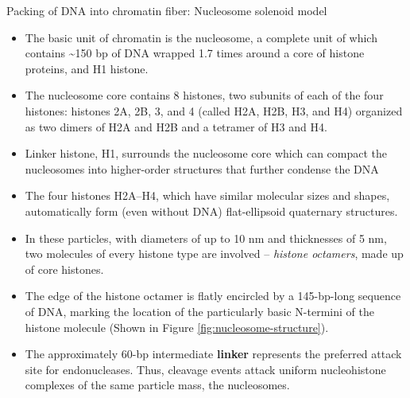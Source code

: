 \documentclass[11pt,dvipsnames,ignorenonframetext,aspectratio=169]{beamer}
\providecommand{\tightlist}{%
  \setlength{\itemsep}{0pt}\setlength{\parskip}{0pt}}
\begin{document}
\begin{frame}{Packing of DNA into chromatin fiber: Nucleosome solenoid
model}
\protect\hypertarget{packing-of-dna-into-chromatin-fiber-nucleosome-solenoid-model}{}

\small

\begin{itemize}
\tightlist
\item
  The basic unit of chromatin is the nucleosome, a complete unit of
  which contains \textasciitilde{}150 bp of DNA wrapped 1.7 times around
  a core of histone proteins, and H1 histone.
\item
  The nucleosome core contains 8 histones, two subunits of each of the
  four histones: histones 2A, 2B, 3, and 4 (called H2A, H2B, H3, and H4)
  organized as two dimers of H2A and H2B and a tetramer of H3 and H4.
\item
  Linker histone, H1, surrounds the nucleosome core which can compact
  the nucleosomes into higher-order structures that further condense the
  DNA
\item
  The four histones H2A--H4, which have similar molecular sizes and
  shapes, automatically form (even without DNA) flat-ellipsoid
  quaternary structures.
\item
  In these particles, with diameters of up to 10 nm and thicknesses of 5
  nm, two molecules of every histone type are involved -- \emph{histone
  octamers}, made up of core histones.
\item
  The edge of the histone octamer is flatly encircled by a 145-bp-long
  sequence of DNA, marking the location of the particularly basic
  N-termini of the histone molecule (Shown in Figure
  \ref{fig:nucleosome-structure}).
\item
  The approximately 60-bp intermediate \textbf{linker} represents the
  preferred attack site for endonucleases. Thus, cleavage events attack
  uniform nucleohistone complexes of the same particle mass, the
  nucleosomes.
\end{itemize}

\end{frame}
\end{document}
